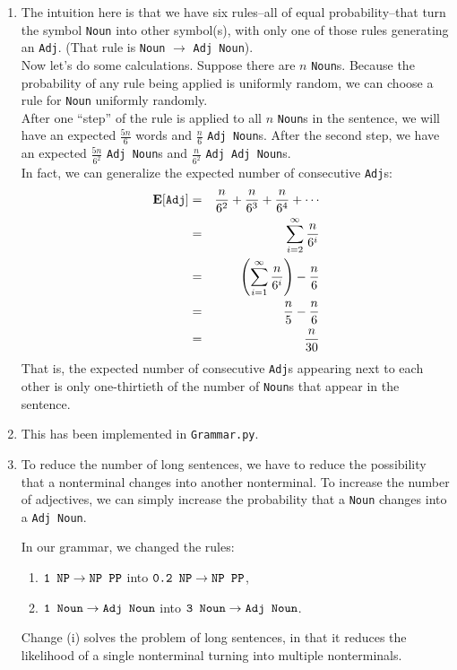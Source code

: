 \documentclass[11pt]{article}
\newcommand{\expct}[1]{\ensuremath{\text{{\bf E}$\left[#1\right]$}}}
\newcommand{\code}[1]{\texttt{#1}}
\begin{document}
\begin{enumerate}
\item 
	The intuition here is that we have six rules--all of equal probability--that turn the symbol \code{Noun} into other symbol(s), with only one of those rules generating an \code{Adj}. 
	(That rule is \code{Noun} $\to$ \code{Adj Noun}). \vspace{4pt} \\
Now let's do some calculations. Suppose there are $n$ \code{Noun}s. Because the probability of any rule being applied is uniformly random, we can choose a rule for \code{Noun} uniformly randomly. \vspace{4pt} \\
After one ``step'' of the rule is applied to all $n$ \code{Noun}s in the sentence, we will have an expected $\frac{5n}{6}$ words and $\frac{n}{6}$ \code{Adj Noun}s. After the second step, we have an expected $\frac{5n}{6^2}$ \code{Adj Noun}s and $\frac{n}{6^2}$ \code{Adj Adj Noun}s. \vspace{4pt} \\
In fact, we can generalize the expected number of consecutive \code{Adj}s:
\begin{eqnarray*}
	\expct{\code{Adj}} &=& \frac{n}{6^2} + \frac{n}{6^3} + \frac{n}{6^4} + \cdots \\
		&=& \sum\limits_{i=2}^\infty \frac{n}{6^i} \\
		&=& \left( \sum\limits_{i=1}^\infty \frac{n}{6^i} \right) - \frac{n}{6} \\
		&=& \frac{n}{5} - \frac{n}{6} \\
		&=& \frac{n}{30} \\
\end{eqnarray*}
That is, the expected number of consecutive \code{Adj}s appearing next to each other is only one-thirtieth of the number of \code{Noun}s that appear in the sentence.
\item 
	This has been implemented in \code{Grammar.py}.
\item
	To reduce the number of long sentences, we have to reduce the possibility that a nonterminal changes into another nonterminal. To increase the number of adjectives, we can simply increase the probability that a \code{Noun} changes into a \code{Adj Noun}. 
	
	In our grammar, we changed the rules:
	\begin{enumerate} 
	\item $\text{\code{1 NP}} \to \text{\code{NP PP}}$ into $\text{\code{0.2 NP}} \to \text{\code{NP PP}}$,
	\item $\text{\code{1 Noun}} \to \text{\code{Adj Noun}}$ into $\text{\code{3 Noun}} \to \text{\code{Adj Noun}}$.
	\end{enumerate}
	Change (i) solves the problem of long sentences, in that it reduces the likelihood of a single nonterminal turning into multiple nonterminals.
	

\end{enumerate}
\end{document}
